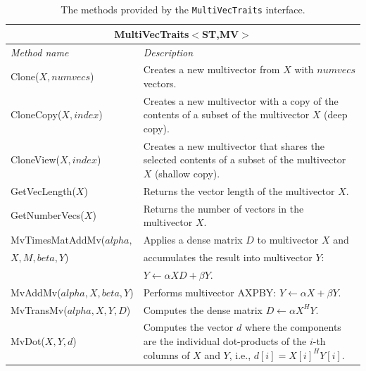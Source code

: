 \documentclass[acmtoms]{acmtrans2m}
\newcommand{\aspace}[1]{\texttt{#1}}
\begin{document}
\begin{table}
\begin{center}
  \caption{The methods provided by the \aspace{MultiVecTraits} interface.}
\label{tab:anasazi:mvt}
\begin{tabular}{| p{4cm} | p{8cm} |}
\hline
\multicolumn{2}{|c|}{\textbf{MultiVecTraits$<$ST,MV$>$}} \\\hline
\emph{Method name} & \emph{Description} \\\hline
Clone($X,numvecs$)           & Creates a new multivector from $X$ with
$numvecs$ vectors.  \\\hline

CloneCopy($X,index$) & Creates a new multivector with a copy of the contents of
a subset of the multivector $X$ (deep copy). \\\hline

CloneView($X,index$) & Creates a new multivector that shares the selected
contents of a subset of the multivector $X$ (shallow copy).  \\\hline

GetVecLength($X$) & Returns the vector length of the multivector $X$.
\\\hline

GetNumberVecs($X$)& Returns the number of vectors in the multivector $X$.
\\\hline

MvTimesMatAddMv($alpha,$ & Applies a dense matrix $D$ to multivector $X$ and \\ 
           $X,M,beta,Y$) & accumulates the result into multivector $Y$:\\ & $Y \leftarrow \alpha X D + \beta Y$.  \\\hline

MvAddMv($alpha,X,beta,Y$)  & Performs multivector AXPBY: $Y \leftarrow \alpha X + \beta Y$.
\\\hline

MvTransMv($alpha,X,Y,D$) & Computes the dense matrix $D \leftarrow \alpha X^H Y$.
\\\hline

MvDot($X,Y,d$) & Computes the vector $d$ where the components are the
individual dot-products of the $i$-th columns of $X$ and $Y$, i.e.,
$d[i] = X[i]^H Y[i]$.  \\\hline


\end{tabular}
\end{center}
\end{table}
\end{document}
